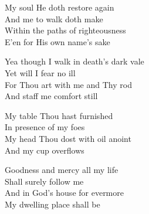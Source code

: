 \documentclass{beamer}
\begin{document}
{\begin{frame}{}
My soul He doth restore again\\ 
And me to walk doth make\\ 
Within the paths of righteousness\\ 
E'en for His own name's sake 

\end{frame}

\hypertarget{The Lord's my Shepherd['Psalm 23'](Trad)3}{}
\begin{frame}{}
\fontsize{ 18 }{ 23 }\selectfont

Yea though I walk in death's dark vale\\ 
Yet will I fear no ill\\ 
For Thou art with me and Thy rod\\ 
And staff me comfort still 

\end{frame}

\hypertarget{The Lord's my Shepherd['Psalm 23'](Trad)4}{}
\begin{frame}{}
\fontsize{ 18 }{ 23 }\selectfont

My table Thou hast furnished\\ 
In presence of my foes\\ 
My head Thou dost with oil anoint\\ 
And my cup overflows 

\end{frame}

\hypertarget{The Lord's my Shepherd['Psalm 23'](Trad)5}{}
\begin{frame}{}
\fontsize{ 18 }{ 23 }\selectfont

Goodness and mercy all my life\\ 
Shall surely follow me\\ 
And in God's house for evermore\\ 
My dwelling place shall be 

\end{frame}

}
\end{document}
